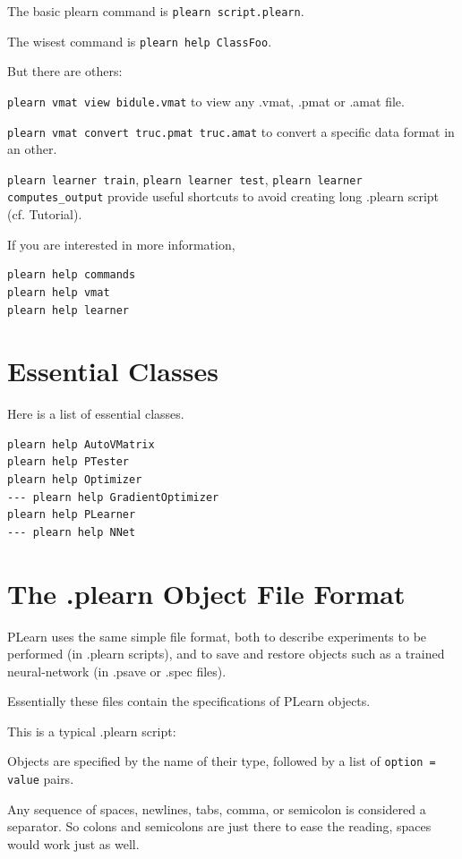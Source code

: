 \documentclass[11pt]{book}
\begin{document}
The basic plearn command is \texttt{plearn script.plearn}.

The wisest command is \texttt{plearn help ClassFoo}.

But there are others:

\texttt{plearn vmat view bidule.vmat} to view any .vmat, .pmat or .amat file.

\texttt{plearn vmat convert truc.pmat truc.amat} to convert a specific data format in an other.

\texttt{plearn learner train}, \texttt{plearn learner test}, \texttt{plearn
  learner computes\_output} provide useful shortcuts to avoid creating long
.plearn script (cf. Tutorial).

If you are interested in more information,

\begin{verbatim}
plearn help commands
plearn help vmat
plearn help learner
\end{verbatim}

\section{Essential Classes}

Here is a list of essential classes.

\begin{verbatim}
plearn help AutoVMatrix
plearn help PTester
plearn help Optimizer
--- plearn help GradientOptimizer
plearn help PLearner
--- plearn help NNet
\end{verbatim}

\section{The .plearn Object File Format}

PLearn uses the same simple file format, both to describe experiments to be
performed (in .plearn scripts), and to save and restore objects
such as a trained neural-network (in .psave or .spec files).

Essentially these files contain the specifications of PLearn objects.

This is a typical .plearn script:



Objects are specified by the name of their type, followed by a list of
\verb!option = value! pairs. 

Any sequence of spaces, newlines, tabs, comma, or semicolon is considered a
separator. So colons and semicolons are just there to ease the reading,
spaces would work just as well.
\end{document}
